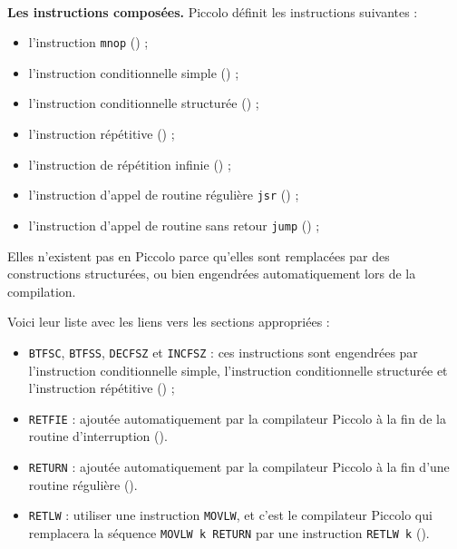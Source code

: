 ~\\
\textbf{Les instructions composées.} Piccolo définit les instructions suivantes :
\begin{itemize}
  \item l'instruction \texttt{mnop} () ;
  \item l'instruction conditionnelle simple () ;
  \item l'instruction conditionnelle structurée () ;
  \item l'instruction répétitive () ;
  \item l'instruction de répétition infinie () ;
  \item l'instruction d'appel de routine régulière \texttt{jsr} () ;
  \item l'instruction d'appel de routine sans retour \texttt{jump} () ;
\end{itemize}





Elles n’existent pas en Piccolo parce qu’elles sont remplacées par des constructions structurées, ou bien engendrées automatiquement lors de la compilation.

Voici leur liste avec les liens vers les sections appropriées :\begin{itemize}
  \item \texttt{BTFSC}, \texttt{BTFSS}, \texttt{DECFSZ} et \texttt{INCFSZ} : ces instructions sont engendrées par l’instruction conditionnelle simple, l’instruction conditionnelle structurée et l’instruction répétitive () ;
  \item \texttt{RETFIE} : ajoutée automatiquement par la compilateur Piccolo à la fin de la routine d'interruption ().
  \item \texttt{RETURN} : ajoutée automatiquement par la compilateur Piccolo à la fin d'une routine régulière ().
  \item \texttt{RETLW} : utiliser une instruction \texttt{MOVLW}, et c’est le compilateur Piccolo qui remplacera la séquence \texttt{MOVLW k RETURN} par une instruction \texttt{RETLW k} ().

\end{itemize}





